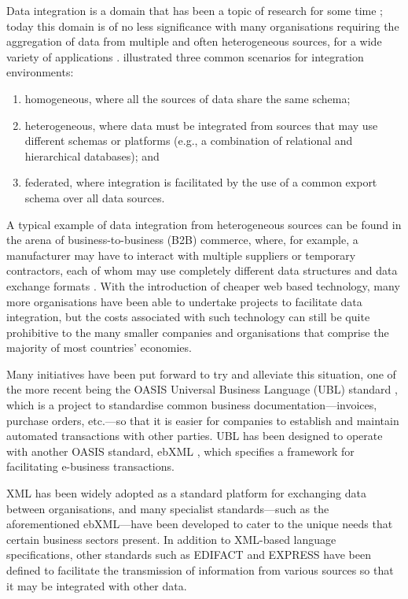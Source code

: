 \documentclass{CRPITStyle}
\begin{document}
Data integration is a domain that has been a topic of research for some
time \cite{Beck-R-2002-Bled,Wied-G-1993-SIGMOD}; today this domain is of
no less significance with many organisations requiring the aggregation
of data from multiple and often heterogeneous sources, for a wide
variety of applications \cite{Haas-LM-1999-DEB}.
 illustrated three common scenarios for
integration environments:

\begin{enumerate}

	\item homogeneous, where all the sources of data share the same
	schema;

	\item heterogeneous, where data must be integrated from sources that
	may use different schemas or platforms (e.g., a combination of
	relational and hierarchical databases); and

	\item federated, where integration is facilitated by the use of a
	common export schema over all data sources.

\end{enumerate}

A typical example of data integration from heterogeneous sources can be
found in the arena of business-to-business (B2B) commerce, where, for
example, a manufacturer may have to interact with multiple suppliers or
temporary contractors, each of whom may use completely different data
structures and data exchange formats \cite{Ston-M-2001-SIGMOD}. With the
introduction of cheaper web based technology, many more organisations
have been able to undertake projects to facilitate data integration, but
the costs associated with such technology can still be quite prohibitive
to the many smaller companies and organisations that comprise the
majority of most countries' economies.

Many initiatives have been put forward to try and alleviate this
situation, one of the more recent being the OASIS Universal Business
Language (UBL) standard \cite{Mead-B-2004-UBL}, which is a project to
standardise common business documentation---invoices, purchase orders,
etc.---so that it is easier for companies to establish and maintain
automated transactions with other parties. UBL has been designed to
operate with another OASIS standard, ebXML \cite{Eise-B-2001-ebXML},
which specifies a framework for facilitating e-business transactions.

XML has been widely adopted as a standard platform for exchanging data
between organisations, and many specialist standards---such as the
aforementioned ebXML---have been developed to cater to the unique needs
that certain business sectors present. In addition to XML-based language
specifications, other standards such as EDIFACT and EXPRESS have been
defined to facilitate the transmission of information from various
sources so that it may be integrated with other data.
\end{document}
